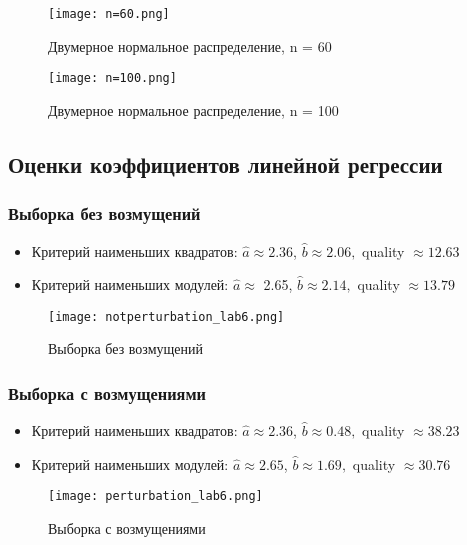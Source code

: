 \documentclass[12pt,a4paper]{scrartcl}
\begin{document}
	\begin{figure}[H]
	    \centering
	    \texttt{[image: n=60.png]}
	    \caption{Двумерное нормальное распределение, n = 60}
	    \label{fig:f60}
	\end{figure}
	
	\begin{figure}[H]
	    \centering
	    \texttt{[image: n=100.png]}
	    \caption{Двумерное нормальное распределение, n = 100}
	    \label{fig:f100}
	\end{figure}

\subsection{Оценки коэффициентов линейной регрессии}
	\subsubsection{Выборка без возмущений}
	\begin{itemize}
	    \item{Критерий наименьших квадратов:}
	    $\hat{a}\approx 2.36$, $\hat{b}\approx 2.06,$ quality $ \approx  12.63 $
	    \item{Критерий наименьших модулей:}
	     $\hat{a}\approx$ 2.65, $\hat{b}\approx 2.14,$ quality $\approx  13.79$
	\end{itemize}
	\begin{figure}[H]
	    \centering
	    \texttt{[image: notperturbation\_lab6.png]}
	    \caption{Выборка без возмущений}
	    \label{w/o_dist}
	\end{figure}
	
	\subsubsection{Выборка с возмущениями}
	\begin{itemize}
	    \item{Критерий наименьших квадратов:}
	    $\hat{a}\approx 2.36$, $\hat{b}\approx 0.48,$ quality $\approx  38.23$
	    \item{Критерий наименьших модулей:}
	     $\hat{a}\approx 2.65$, $\hat{b}\approx 1.69,$ quality $\approx  30.76$
	\end{itemize}
	\begin{figure}[H]
	    \centering
	    \texttt{[image: perturbation\_lab6.png]}
	    \caption{Выборка с возмущениями}
	    \label{w/o_dist}
	\end{figure}
\end{document}
